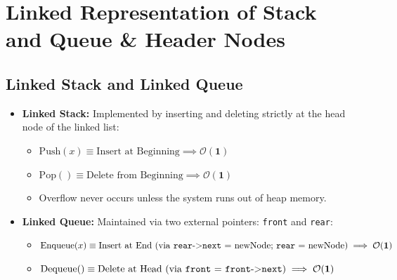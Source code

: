 \documentclass[12pt,a4paper]{article}
\begin{document}
\section{Linked Representation of Stack and Queue \& Header Nodes}

\subsection{Linked Stack and Linked Queue}
\begin{itemize}[leftmargin=*, itemsep=3pt]
  \item \textbf{Linked Stack:} Implemented by inserting and deleting strictly at the head node of the linked list:
  \begin{itemize}[leftmargin=*, nosep]
    \item $\text{Push}(x) \equiv \text{Insert at Beginning} \implies \mathbf{\mathcal{O}(1)}$
    \item $\text{Pop}() \equiv \text{Delete from Beginning} \implies \mathbf{\mathcal{O}(1)}$
    \item Overflow never occurs unless the system runs out of heap memory.
  \end{itemize}
  \item \textbf{Linked Queue:} Maintained via two external pointers: \texttt{front} and \texttt{rear}:
  \begin{itemize}[leftmargin=*, nosep]
    \item $\text{Enqueue}(x) \equiv \text{Insert at End (via \texttt{rear}->\texttt{next} = newNode; \texttt{rear} = newNode)} \implies \mathbf{\mathcal{O}(1)}$
    \item $\text{Dequeue}() \equiv \text{Delete at Head (via \texttt{front} = \texttt{front}->\texttt{next})} \implies \mathbf{\mathcal{O}(1)}$
  \end{itemize}
\end{itemize}
\end{document}

